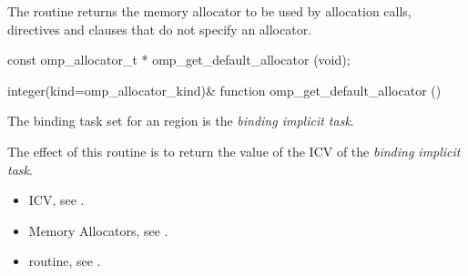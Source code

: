 \summary
The  routine returns the memory allocator to be used by allocation calls,  directives and  clauses that do not specify an allocator.

\format
\begin{ccppspecific}
\begin{ompcFunction}
const omp_allocator_t * omp_get_default_allocator (void);
\end{ompcFunction}
\end{ccppspecific}
\begin{fortranspecific}
\begin{ompfFunction}
integer(kind=omp_allocator_kind)&
function omp_get_default_allocator ()
\end{ompfFunction}
\end{fortranspecific}

\binding

The binding task set for an  region is the \emph{binding implicit task}.

\effect

The effect of this routine is to return the value of the  ICV of the \emph{binding implicit task}.

\crossreferences
\begin{itemize}
\item {} ICV, see .
\item Memory Allocators, see .
\item {} routine, see .
\end{itemize}


